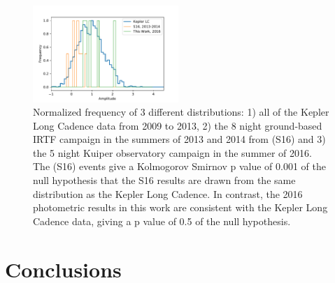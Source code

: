 \documentclass[preprint]{aastex61}
\begin{document}
\begin{figure}[!hbtp]
\begin{centering}
\includegraphics[width=0.49\textwidth]{images/kepler/amp_distributions_comparison.pdf}
\caption{Normalized frequency of 3 different distributions: 1) all of the Kepler Long Cadence data from 2009 to 2013, 2) the 8 night ground-based IRTF campaign in the summers of 2013 and 2014 from \citet{schlawin2016kic1255} (S16) and 3) the 5 night Kuiper observatory campaign in the summer of 2016.
The \citet{schlawin2016kic1255} (S16) events give a Kolmogorov Smirnov p value of 0.001 of the null hypothesis that the S16 results are drawn from the same distribution as the Kepler Long Cadence.
In contrast, the 2016 photometric results in this work are consistent with the Kepler Long Cadence data, giving a  p value of 0.5 of the null hypothesis.}\label{fig:histoPhot}
\end{centering}
\end{figure}


%
%



\section{Conclusions}\label{sec:conclusions}
\end{document}
